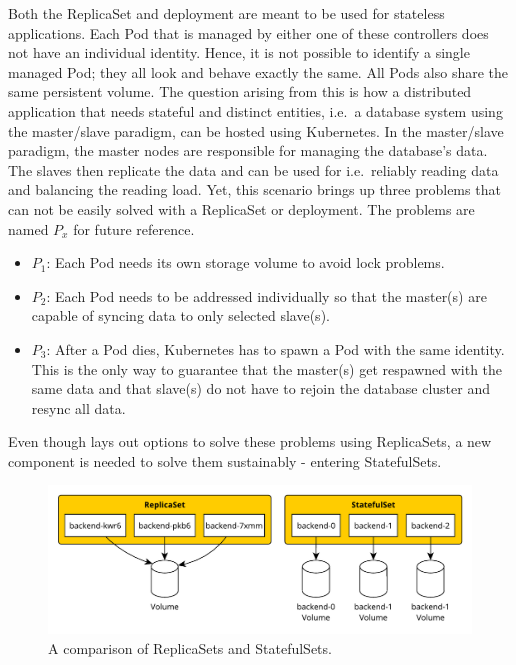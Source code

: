 
Both the ReplicaSet and deployment are meant to be used for stateless
applications. Each Pod that is managed by either one of these controllers does
not have an individual identity. Hence, it is not possible to identify a single
managed Pod; they all look and behave exactly the same. All Pods also share the
same persistent volume. The question arising from this is how a distributed
application that needs stateful and distinct entities, i.e.\ a database system
using the master/slave paradigm, can be hosted using Kubernetes. In the
master/slave paradigm, the master nodes are responsible for managing the
database's data. The slaves then replicate the data and can be used for i.e.\
reliably reading data and balancing the reading load. Yet, this scenario brings
up three problems that can not be easily solved with a ReplicaSet or
deployment. The problems are named $P_x$ for future reference.

\begin{itemize}
  \item \textbf{$P_1$}: Each Pod needs its own storage volume to avoid lock problems.
  \item \textbf{$P_2$}: Each Pod needs to be addressed individually so that the master(s) are
    capable of syncing data to only selected slave(s).
  \item \textbf{$P_3$}: After a Pod dies, Kubernetes has to spawn a Pod with
    the same identity. This is the only way to guarantee that the master(s)
    get respawned with the same data and that slave(s) do not have to rejoin
    the database cluster and resync all data.
\end{itemize}

Even though \autocite[Ch. 10]{LuksaKubernetesAction2017} lays out options to
solve these problems using ReplicaSets, a new component is needed to solve them
sustainably - entering StatefulSets. 

\begin{figure}[H]
  \begin{center}
  \includegraphics[scale=0.65]{images/figures/statefulSets_vs_replicaSets.pdf}
\end{center}
\caption{A comparison of ReplicaSets and StatefulSets.}%
\label{fig:statefulSetsVSReplicaSets}
\end{figure}

